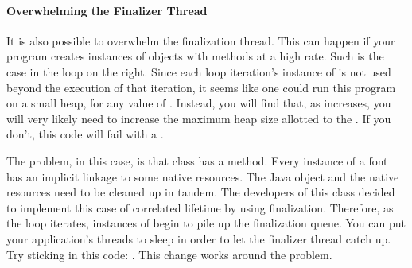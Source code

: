\paragraph{Overwhelming the Finalizer Thread}
It is also possible to overwhelm the finalization thread. This can happen if
your program creates instances of objects with  methods at a high
rate. Such is the case in the loop on the right. Since each loop iteration's
instance of  is not used beyond the execution of that iteration, it
seems like one could run this program on a small heap, for any value of
. 
Instead, you will find that, 
as 
increases, you will very likely need to increase the maximum heap size allotted
to the \jre. If you don't, this code will fail with a .

The problem, in this case, is that  class has a 
method. Every instance of a font has an implicit linkage to some native
resources. The Java object and the native resources need to be cleaned up in
tandem. The developers of this class decided to implement this case of
correlated lifetime by using finalization.
Therefore, as the loop iterates, instances of  begin to pile up the
finalization queue.
You can put
your application's threads to sleep in order to let the finalizer thread catch
up. Try sticking in this code: . This change works around the problem.











